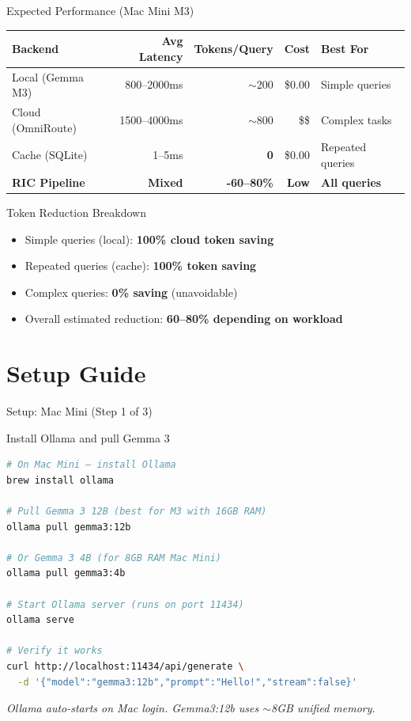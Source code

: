 \documentclass[aspectratio=169]{beamer}
\begin{document}
\begin{frame}{Expected Performance (Mac Mini M3)}
\begin{table}
\centering
\begin{tabular}{lrrrl}
\toprule
\textbf{Backend} & \textbf{Avg Latency} & \textbf{Tokens/Query} & \textbf{Cost} & \textbf{Best For} \\
\midrule
\color{localgreen}Local (Gemma M3)  & 800--2000ms & $\sim$200    & \color{localgreen}\$0.00 & Simple queries \\
\color{cloudred}Cloud (OmniRoute)   & 1500--4000ms & $\sim$800   & \color{cloudred}\$\$    & Complex tasks \\
\color{cacheyellow}Cache (SQLite)   & 1--5ms      & \textbf{0}   & \color{cacheyellow}\$0.00 & Repeated queries \\
\midrule
\textbf{RIC Pipeline}               & \textbf{Mixed} & \textbf{-60--80\%} & \textbf{Low} & \textbf{All queries} \\
\bottomrule
\end{tabular}
\end{table}

\vspace{0.3cm}
\begin{block}{Token Reduction Breakdown}
\begin{itemize}
  \item Simple queries (local): \textbf{100\% cloud token saving}
  \item Repeated queries (cache): \textbf{100\% token saving}
  \item Complex queries: \textbf{0\% saving} (unavoidable)
  \item Overall estimated reduction: \textbf{60--80\% depending on workload}
\end{itemize}
\end{block}
\end{frame}

\section{Setup Guide}

\begin{frame}[fragile]{Setup: Mac Mini (Step 1 of 3)}
\begin{block}{Install Ollama and pull Gemma 3}
\begin{lstlisting}[language=bash]
# On Mac Mini — install Ollama
brew install ollama

# Pull Gemma 3 12B (best for M3 with 16GB RAM)
ollama pull gemma3:12b

# Or Gemma 3 4B (for 8GB RAM Mac Mini)
ollama pull gemma3:4b

# Start Ollama server (runs on port 11434)
ollama serve

# Verify it works
curl http://localhost:11434/api/generate \
  -d '{"model":"gemma3:12b","prompt":"Hello!","stream":false}'
\end{lstlisting}
\end{block}
\textit{Ollama auto-starts on Mac login. Gemma3:12b uses $\sim$8GB unified memory.}
\end{frame}
\end{document}
